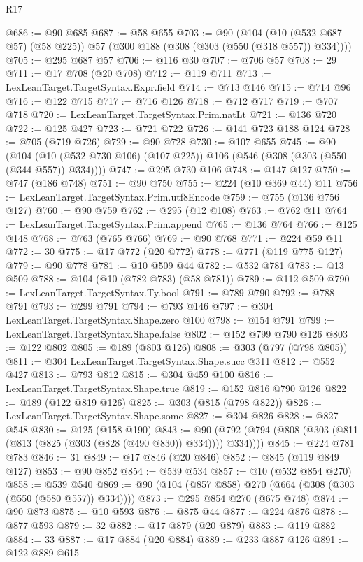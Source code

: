 \begin{lexlean}{R17}
\begin{coremodule}
@686 := @90 @685
@687 := @58 @655
@703 := @90
    (@104 (@10 (@532 @687 @57) (@58 @225)) @57 (@300 @188 (@308 (@303 (@550 (@318 @557)) @334))))
@705 := @295 @687 @57
@706 := @116 @30
@707 := @706 @57
@708 := 29
@711 := @17 @708 (@20 @708)
@712 := @119 @711
@713 := LexLeanTarget.TargetSyntax.Expr.field
@714 := @713 @146
@715 := @714 @96
@716 := @122 @715
@717 := @716 @126
@718 := @712 @717
@719 := @707 @718
@720 := LexLeanTarget.TargetSyntax.Prim.natLt
@721 := @136 @720
@722 := @125 @427
@723 := @721 @722
@726 := @141 @723 @188 @124
@728 := @705 (@719 @726)
@729 := @90 @728
@730 := @107 @655
@745 := @90
    (@104 (@10 (@532 @730 @106) (@107 @225)) @106 (@546 (@308 (@303 (@550 (@344 @557)) @334))))
@747 := @295 @730 @106
@748 := @147 @127
@750 := @747 (@186 @748)
@751 := @90 @750
@755 := @224 (@10 @369 @44) @11
@756 := LexLeanTarget.TargetSyntax.Prim.utf8Encode
@759 := @755 (@136 @756 @127)
@760 := @90 @759
@762 := @295 (@12 @108)
@763 := @762 @11
@764 := LexLeanTarget.TargetSyntax.Prim.append
@765 := @136 @764
@766 := @125 @148
@768 := @763 (@765 @766)
@769 := @90 @768
@771 := @224 @59 @11
@772 := 30
@775 := @17 @772 (@20 @772)
@778 := @771 (@119 @775 @127)
@779 := @90 @778
@781 := @10 @509 @44
@782 := @532 @781
@783 := @13 @509
@788 := @104 (@10 (@782 @783) (@58 @781))
@789 := @112 @509
@790 := LexLeanTarget.TargetSyntax.Ty.bool
@791 := @789 @790
@792 := @788 @791
@793 := @299 @791
@794 := @793 @146
@797 := @304 LexLeanTarget.TargetSyntax.Shape.zero @100
@798 := @154 @791
@799 := LexLeanTarget.TargetSyntax.Shape.false
@802 := @152 @799 @790 @126
@803 := @122 @802
@805 := @189 (@803 @126)
@808 := @303 (@797 (@798 @805))
@811 := @304 LexLeanTarget.TargetSyntax.Shape.succ @311
@812 := @552 @427
@813 := @793 @812
@815 := @304 @459 @100
@816 := LexLeanTarget.TargetSyntax.Shape.true
@819 := @152 @816 @790 @126
@822 := @189 (@122 @819 @126)
@825 := @303 (@815 (@798 @822))
@826 := LexLeanTarget.TargetSyntax.Shape.some
@827 := @304 @826
@828 := @827 @548
@830 := @125 (@158 @190)
@843 := @90 (@792 (@794 (@808 (@303 (@811 (@813 (@825 (@303 (@828 (@490 @830)) @334)))) @334))))
@845 := @224 @781 @783
@846 := 31
@849 := @17 @846 (@20 @846)
@852 := @845 (@119 @849 @127)
@853 := @90 @852
@854 := @539 @534
@857 := @10 (@532 @854 @270)
@858 := @539 @540
@869 := @90 (@104 (@857 @858) @270 (@664 (@308 (@303 (@550 (@580 @557)) @334))))
@873 := @295 @854 @270 (@675 @748)
@874 := @90 @873
@875 := @10 @593
@876 := @875 @44
@877 := @224 @876
@878 := @877 @593
@879 := 32
@882 := @17 @879 (@20 @879)
@883 := @119 @882
@884 := 33
@887 := @17 @884 (@20 @884)
@889 := @233 @887 @126
@891 := @122 @889 @615

\end{coremodule}
\end{lexlean}
